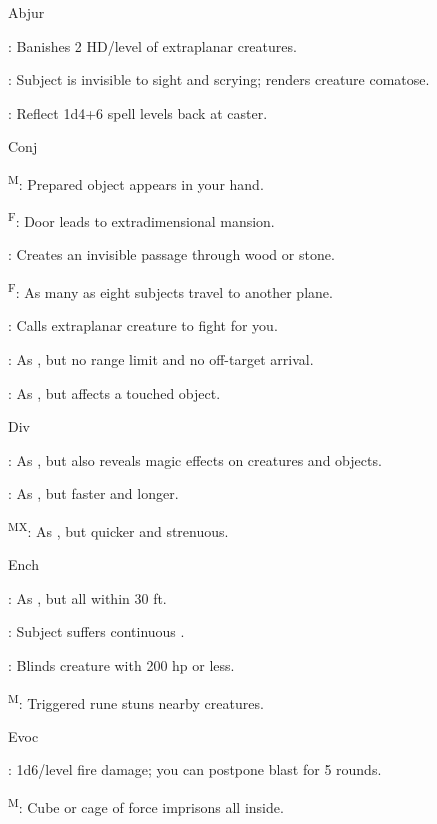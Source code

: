 Abjur

: Banishes 2 HD/level of extraplanar creatures.

: Subject is invisible to sight and scrying; renders creature comatose.

: Reflect 1d4+6 spell levels back at caster.

Conj

\textsuperscript{M}: Prepared object appears in your hand.

\textsuperscript{F}: Door leads to extradimensional mansion.

: Creates an invisible passage through wood or stone.

\textsuperscript{F}: As many as eight subjects travel to another plane.

: Calls extraplanar creature to fight for you.

: As , but no range limit and no off-target arrival.

: As , but affects a touched object.

Div

: As , but also reveals magic effects on creatures and objects.

: As , but faster and longer.

\textsuperscript{M}\textsuperscript{X}: As , but quicker and strenuous.

Ench

: As , but all within 30 ft.

: Subject suffers continuous .

: Blinds creature with 200 hp or less.

\textsuperscript{M}: Triggered rune stuns nearby creatures.

Evoc

: 1d6/level fire damage; you can postpone blast for 5 rounds.

\textsuperscript{M}: Cube or cage of force imprisons all inside.

